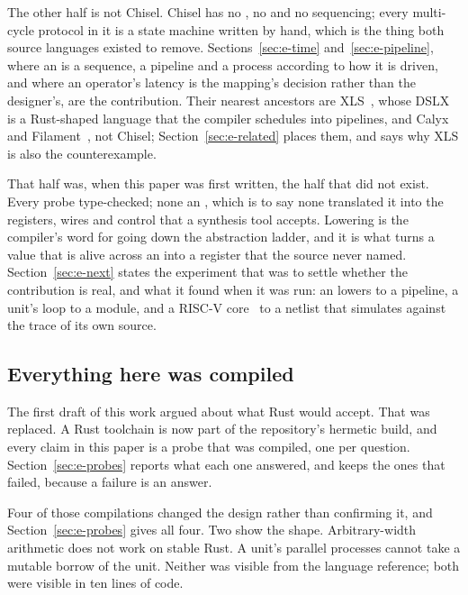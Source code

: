 The other half is not Chisel. Chisel has no , no
 and no sequencing; every multi-cycle protocol in it is a
state machine written by hand, which is the thing both source languages
existed to remove. Sections~\ref{sec:e-time} and~\ref{sec:e-pipeline},
where an  is a sequence, a pipeline and a process
according to how it is driven, and where an operator's latency is the
mapping's decision rather than the designer's, are the contribution.
Their nearest ancestors are XLS~\cite{xls}, whose DSLX is a
Rust-shaped language that the compiler schedules into pipelines, and
Calyx~\cite{calyx} and Filament~\cite{filament}, not Chisel;
Section~\ref{sec:e-related} places them, and says why XLS is also the
counterexample.

That half was, when this paper was first written, the half that did
not exist. Every probe type-checked; none  an
, which is to say none translated it into the
registers, wires and control that a synthesis tool accepts. Lowering
is the compiler's word for going down the abstraction ladder, and it
is what turns a value that is alive across an  into a
register that the source never named. Section~\ref{sec:e-next} states
the experiment that was to settle whether the contribution is real,
and what it found when it was run: an  lowers to a
pipeline, a unit's  loop to a module, and a RISC-V
core~\cite{vreteno} to a netlist that simulates against the trace of
its own source.

\subsection{Everything here was compiled}

The first draft of this work argued about what Rust would accept. That was
replaced. A Rust toolchain is now part of the repository's hermetic build,
and every claim in this paper is a probe that was compiled, one per
question. Section~\ref{sec:e-probes} reports what each one answered, and
keeps the ones that failed, because a failure is an answer.

Four of those compilations changed the design rather than confirming it,
and Section~\ref{sec:e-probes} gives all four. Two show the shape.
Arbitrary-width arithmetic does not work on stable Rust. A unit's parallel
processes cannot take a mutable borrow of the unit. Neither was visible
from the language reference; both were visible in ten lines of code.
